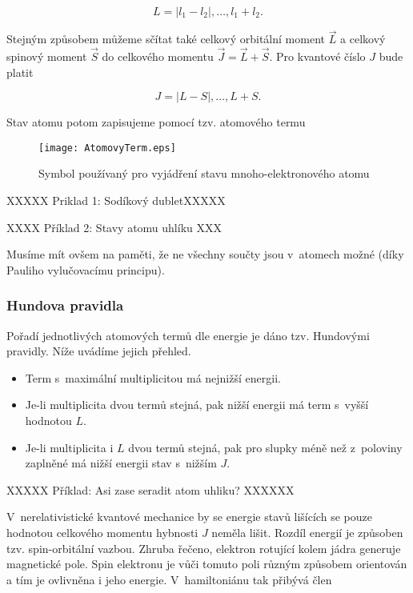 \begin{equation}
L = \vert l_1 - l_2 \vert , \dots , l_1 + l_2.
\label{rov:VE-65}
\end{equation}

Stejným způsobem můžeme sčítat také celkový orbitální moment $\vec{L}$ a celkový spinový moment $\vec{S}$ do celkového momentu $\vec{J} = \vec{L} + \vec{S}$. Pro kvantové číslo $J$ bude platit

\begin{equation}
J = \vert L - S \vert, \dots, L+S.
\label{rov:VE-66}
\end{equation}


Stav atomu potom zapisujeme pomocí tzv. atomového termu


\begin{figure} [ht]
\centering
\texttt{[image: AtomovyTerm.eps]}
\caption[Atomové termy]{Symbol používaný pro vyjádření stavu mnoho-elektronového atomu}
\label{obr:ATerm}
\end{figure}


XXXXX Priklad 1: Sodíkový dubletXXXXX

XXXX Příklad 2: Stavy atomu uhlíku XXX


Musíme mít ovšem na paměti, že ne všechny součty jsou v~atomech možné (díky Pauliho vylučovacímu principu).



\subsubsection{Hundova pravidla}
Pořadí jednotlivých atomových termů dle energie je dáno tzv. Hundovými pravidly. Níže uvádíme jejich přehled.

\begin{itemize}
\item Term s~maximální multiplicitou má nejnižší energii.

\item Je-li multiplicita dvou termů stejná, pak nižší energii má term s~vyšší hodnotou $L$.

\item Je-li multiplicita i $L$ dvou termů stejná, pak pro slupky méně než z~poloviny zaplněné má nižší energii stav s~nižším $J$.  
 
\end{itemize}


XXXXX Příklad: Asi zase seradit atom uhliku? XXXXXX

V~nerelativistické kvantové mechanice by se energie stavů lišících se pouze hodnotou celkového momentu hybnosti $J$ neměla lišit. Rozdíl energií je způsoben tzv. spin-orbitální vazbou. Zhruba řečeno, elektron rotující kolem jádra generuje magnetické pole. Spin elektronu je vůči tomuto poli různým způsobem orientován a tím je ovlivněna i jeho energie. V~hamiltoniánu tak přibývá člen

